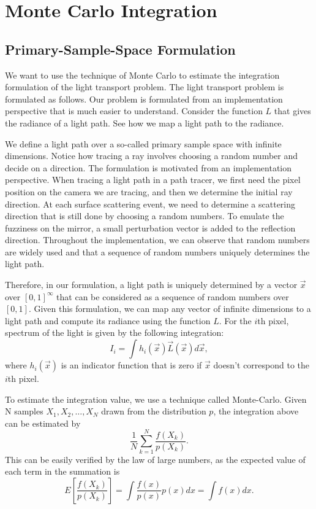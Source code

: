 \documentclass{article}
\begin{document}
\section{Monte Carlo Integration}

\subsection{Primary-Sample-Space Formulation}

We want to use the technique of Monte Carlo to estimate the integration formulation of the light transport problem. The light transport problem is formulated as follows. Our problem is formulated from an implementation perspective that is much easier to understand. Consider the function $L$ that gives the radiance of a light path. See how we map a light path to the radiance.

We define a light path over a so-called primary sample space with infinite dimensions. Notice how tracing a ray involves choosing a random number and decide on a direction. The formulation is motivated from an implementation perspective. When tracing a light path in a path tracer, we first need the pixel position on the camera we are tracing, and then we determine the initial ray direction. At each surface scattering event, we need to determine a scattering direction that is still done by choosing a random numbers. To emulate the fuzziness on the mirror, a small perturbation vector is added to the reflection direction. Throughout the implementation, we can observe that random numbers are widely used and that a sequence of random numbers uniquely determines the light path.

Therefore, in our formulation, a light path is uniquely determined by a vector $\vec{x}$ over $[0, 1]^\infty$ that can be considered as a sequence of random numbers over $[0, 1]$. Given this formulation, we can map any vector of infinite dimensions to a light path and compute its radiance using the function $L$. For the $i$th pixel, spectrum of the light is given by the following integration:
\[
    I_i = \int h_i(\vec{x})\vec{L}(\vec{x})d\vec{x},
\]
    where $h_i(\vec{x})$ is an indicator function that is zero if $\vec{x}$ doesn't correspond to the $i$th pixel.

To estimate the integration value, we use a technique called Monte-Carlo. Given N samples $X_1, X_2, \dots, X_N$ drawn from the distribution $p$, the integration above can be estimated by
\[
    \frac{1}{N}\sum_{k = 1}^N \frac{f(X_k)}{p(X_k)}.
\]
This can be easily verified by the law of large numbers, as the expected value of each term in the summation is
\[
    E\left[\frac{f(X_k)}{p(X_k)}\right] = \int \frac{f(x)}{p(x)}p(x)dx = \int f(x)dx.
\]
\end{document}
